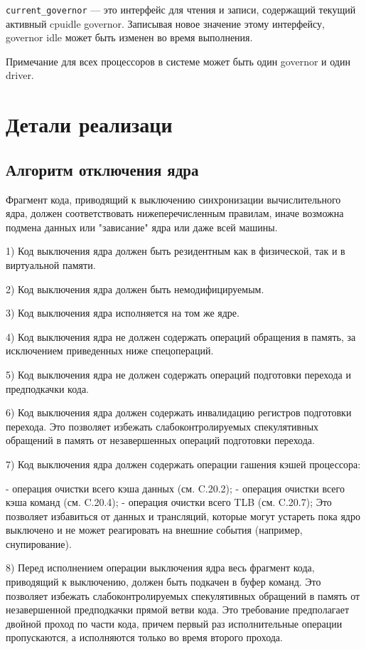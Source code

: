 \documentclass{article}
\begin{document}
\texttt{current\_governor} — это интерфейс для чтения и записи, содержащий текущий активный cpuidle governor. Записывая новое значение этому интерфейсу, governor idle может быть изменен во время выполнения.

Примечание для всех процессоров в системе может быть один governor и один driver.



\newpage
\section{Детали реализаци}

\subsection{Алгоритм отключения ядра}

Фрагмент кода, приводящий к выключению синхронизации вычислительного ядра,
должен соответствовать нижеперечисленным правилам, иначе возможна подмена данных
или "зависание" ядра или даже всей машины.

1) Код выключения ядра должен быть резидентным как в физической, так и в
виртуальной памяти.

2) Код выключения ядра должен быть немодифицируемым.

3) Код выключения ядра исполняется на том же ядре.

4) Код выключения ядра не должен содержать операций обращения в память, за
исключением приведенных ниже спецопераций.

5) Код выключения ядра не должен содержать операций подготовки перехода и
предподкачки кода.

6) Код выключения ядра должен содержать инвалидацию регистров подготовки
перехода. Это позволяет избежать слабоконтролируемых спекулятивных обращений в
память от незавершенных операций подготовки перехода.

7) Код выключения ядра должен содержать операции гашения кэшей процессора:

	- операция очистки всего кэша данных (см. C.20.2);
	       - операция очистки всего кэша команд (см. C.20.4);
	      - операция очистки всего TLB (см. C.20.7);
Это позволяет избавиться от данных и трансляций, которые могут устареть пока
ядро выключено и не может реагировать на внешние события (например,
снупирование).

8) Перед исполнением операции выключения ядра весь фрагмент кода, приводящий к
выключению, должен быть подкачен в буфер команд. Это позволяет избежать
слабоконтролируемых спекулятивных обращений в память от незавершенной
предподкачки прямой ветви кода. Это требование предполагает двойной проход по
части кода, причем первый раз исполнительные операции пропускаются, а
исполняются только во время второго прохода.
\end{document}
